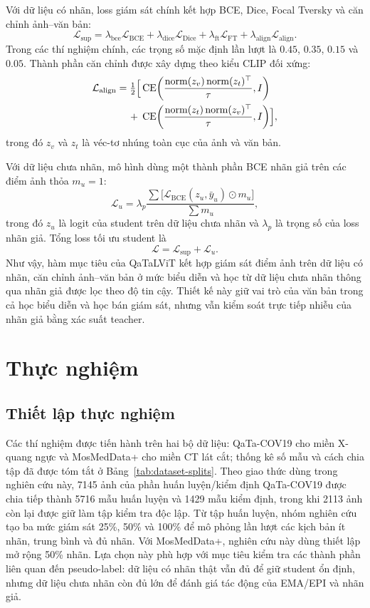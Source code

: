Với dữ liệu có nhãn, loss giám sát chính kết hợp BCE, Dice, Focal Tversky và căn chỉnh ảnh--văn bản:
\[
\mathcal{L}_{\text{sup}} =
\lambda_{\text{bce}}\mathcal{L}_{\text{BCE}} +
\lambda_{\text{dice}}\mathcal{L}_{\text{Dice}} +
\lambda_{\text{ft}}\mathcal{L}_{\text{FT}} +
\lambda_{\text{align}}\mathcal{L}_{\text{align}}.
\]
Trong các thí nghiệm chính, các trọng số mặc định lần lượt là \(0.45\), \(0.35\), \(0.15\) và \(0.05\). Thành phần căn chỉnh được xây dựng theo kiểu CLIP đối xứng:
\[
\begin{aligned}
\mathcal{L}_{\text{align}} =
\tfrac{1}{2}\Bigl[
&\operatorname{CE}\!\left(\frac{\operatorname{norm}(z_v)\operatorname{norm}(z_t)^\top}{\tau}, I\right)\\
+\;&\operatorname{CE}\!\left(\frac{\operatorname{norm}(z_t)\operatorname{norm}(z_v)^\top}{\tau}, I\right)
\Bigr],
\end{aligned}
\]
trong đó \(z_v\) và \(z_t\) là véc-tơ nhúng toàn cục của ảnh và văn bản.

Với dữ liệu chưa nhãn, mô hình dùng một thành phần BCE nhãn giả trên các điểm ảnh thỏa \(m_u=1\):
\[
\mathcal{L}_{u} =
\lambda_p
\frac{\sum \bigl[\mathcal{L}_{\text{BCE}}(z_u,\bar{y}_u)\odot m_u\bigr]}
{\sum m_u},
\]
trong đó \(z_u\) là logit của student trên dữ liệu chưa nhãn và \(\lambda_p\) là trọng số của loss nhãn giả. Tổng loss tối ưu student là
\[
\mathcal{L} = \mathcal{L}_{\text{sup}} + \mathcal{L}_{u}.
\]
Như vậy, hàm mục tiêu của QaTaLViT kết hợp giám sát điểm ảnh trên dữ liệu có nhãn, căn chỉnh ảnh--văn bản ở mức biểu diễn và học từ dữ liệu chưa nhãn thông qua nhãn giả được lọc theo độ tin cậy. Thiết kế này giữ vai trò của văn bản trong cả học biểu diễn và học bán giám sát, nhưng vẫn kiểm soát trực tiếp nhiễu của nhãn giả bằng xác suất teacher.

\section{Thực nghiệm}
\label{sec:setup}

\subsection{Thiết lập thực nghiệm}

Các thí nghiệm được tiến hành trên hai bộ dữ liệu: QaTa-COV19 cho miền X-quang ngực và MosMedData+ cho miền CT lát cắt; thống kê số mẫu và cách chia tập đã được tóm tắt ở Bảng~\ref{tab:dataset-splits}. Theo giao thức dùng trong nghiên cứu này, 7145 ảnh của phần huấn luyện/kiểm định QaTa-COV19 được chia tiếp thành 5716 mẫu huấn luyện và 1429 mẫu kiểm định, trong khi 2113 ảnh còn lại được giữ làm tập kiểm tra độc lập. Từ tập huấn luyện, nhóm nghiên cứu tạo ba mức giám sát 25\%, 50\% và 100\% để mô phỏng lần lượt các kịch bản ít nhãn, trung bình và đủ nhãn. Với MosMedData+, nghiên cứu này dùng thiết lập mở rộng 50\% nhãn. Lựa chọn này phù hợp với mục tiêu kiểm tra các thành phần liên quan đến pseudo-label: dữ liệu có nhãn thật vẫn đủ để giữ student ổn định, nhưng dữ liệu chưa nhãn còn đủ lớn để đánh giá tác động của EMA/EPI và nhãn giả. 

